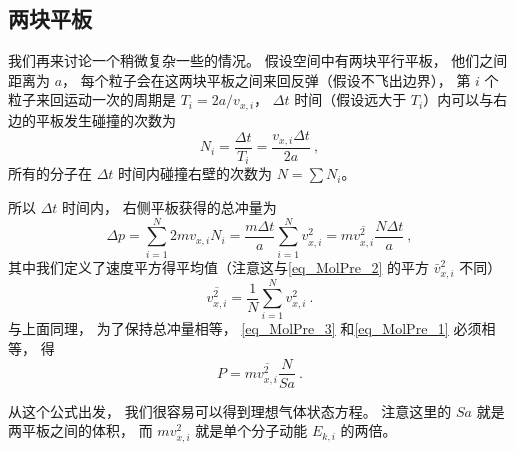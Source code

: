 \subsection{两块平板}
我们再来讨论一个稍微复杂一些的情况。 假设空间中有两块平行平板， 他们之间距离为 $a$， 每个粒子会在这两块平板之间来回反弹（假设不飞出边界）， 第 $i$ 个粒子来回运动一次的周期是 $T_i = 2a/v_{x,i}$， $\Delta t$ 时间（假设远大于 $T_i$）内可以与右边的平板发生碰撞的次数为
\begin{equation}
N_i = \frac{\Delta t}{T_i} = \frac{v_{x,i} \Delta t}{2a}~,
\end{equation}
所有的分子在 $\Delta t$ 时间内碰撞右壁的次数为 $N = \sum N_i$。

所以 $\Delta t$ 时间内， 右侧平板获得的总冲量为
\begin{equation}\label{eq_MolPre_3}
\Delta p = \sum_{i=1}^N 2mv_{x,i} N_i = \frac{m \Delta t}{a} \sum_{i=1}^N v_{x,i}^2 = m\overline {v_{x,i}^2} \frac{ N\Delta t}{a}~,
\end{equation}
其中我们定义了速度平方得平均值（注意这与\autoref{eq_MolPre_2} 的平方 $\bar v_{x,i}^2$ 不同）
\begin{equation}
\overline {v_{x,i}^2} = \frac{1}{N} \sum_{i=1}^N v_{x,i}^2~.
\end{equation}
与上面同理， 为了保持总冲量相等， \autoref{eq_MolPre_3} 和\autoref{eq_MolPre_1} 必须相等， 得
\begin{equation}\label{eq_MolPre_4}
P = m \overline {v_{x,i}^2} \frac{N}{Sa}~.
\end{equation}

从这个公式出发， 我们很容易可以得到理想气体状态方程。 注意这里的 $Sa$ 就是两平板之间的体积， 而 $mv_{x,i}^2$ 就是单个分子动能 $E_{k,i}$ 的两倍。
